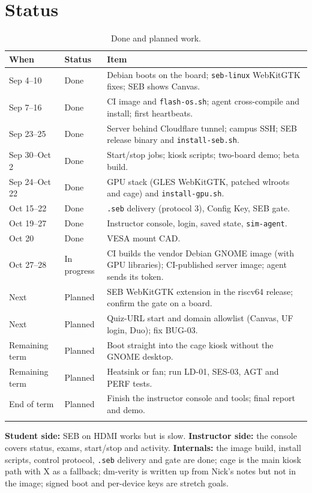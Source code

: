 \documentclass[11pt]{article}
\begin{document}
\section{Status}
\begin{longtable}{@{}p{}p{}p{}@{}}
\toprule
\textbf{When} & \textbf{Status} & \textbf{Item} \\
\midrule
\endhead
Sep 4--10 & Done & Debian boots on the board; \texttt{seb-linux} WebKitGTK fixes; SEB shows Canvas. \\
Sep 7--16 & Done & CI image and \texttt{flash-os.sh}; agent cross-compile and install; first heartbeats. \\
Sep 23--25 & Done & Server behind Cloudflare tunnel; campus SSH; SEB release binary and \texttt{install-seb.sh}. \\
Sep 30--Oct 2 & Done & Start/stop jobs; kiosk scripts; two-board demo; beta build. \\
Sep 24--Oct 22 & Done & GPU stack (GLES WebKitGTK, patched wlroots and cage) and \texttt{install-gpu.sh}. \\
Oct 15--22 & Done & \texttt{.seb} delivery (protocol 3), Config Key, SEB gate. \\
Oct 19--27 & Done & Instructor console, login, saved state, \texttt{sim-agent}. \\
Oct 20 & Done & VESA mount CAD. \\
Oct 27--28 & In progress & CI builds the vendor Debian GNOME image (with GPU libraries); CI-published server image; agent sends its token. \\
Next & Planned & SEB WebKitGTK extension in the riscv64 release; confirm the gate on a board. \\
Next & Planned & Quiz-URL start and domain allowlist (Canvas, UF login, Duo); fix BUG-03. \\
Remaining term & Planned & Boot straight into the cage kiosk without the GNOME desktop. \\
Remaining term & Planned & Heatsink or fan; run LD-01, SES-03, AGT and PERF tests. \\
End of term & Planned & Finish the instructor console and tools; final report and demo. \\
\bottomrule
\caption{Done and planned work.}
\end{longtable}

\textbf{Student side:} SEB on HDMI works but is slow. \textbf{Instructor side:} the console covers status, exams, start/stop and activity. \textbf{Internals:} the image build, install scripts, control protocol, \texttt{.seb} delivery and gate are done; cage is the main kiosk path with X as a fallback; dm-verity is written up from Nick's notes but not in the image; signed boot and per-device keys are stretch goals.
\end{document}
